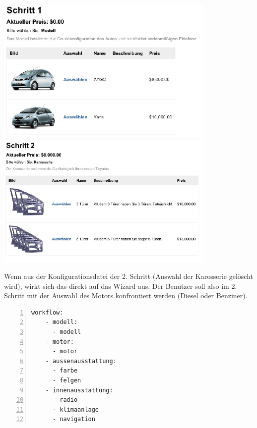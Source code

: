 \documentclass[a4paper,10pt]{article}
\begin{document}
\includegraphics[width=0.8\textwidth]{screenshots/sequence1.png}
\\
\includegraphics[width=0.8\textwidth]{screenshots/sequence2.png}
 
Wenn aus der Konfigurationsdatei der 2. Schritt (Auswahl der Karosserie gelöscht wird), wirkt sich das direkt auf das Wizard aus.
Der Benutzer soll also im 2. Schritt mit der Auswahl des Motors konfrontiert werden (Diesel oder Benziner).

\begin{lstlisting}[numbers=left]
  workflow:
    - modell:  
      - modell 
    - motor:
      - motor
    - aussenausstattung:  
      - farbe 
      - felgen
    - innenausstattung: 
      - radio 
      - klimaanlage
      - navigation
\end{lstlisting}
\end{document}
